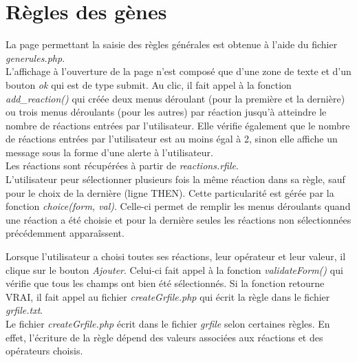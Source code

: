\section{Règles des gènes}
La page permettant la saisie des règles générales est obtenue à l'aide du fichier \emph{generules.php}.\\
L'affichage à l'ouverture de la page n'est composé que d'une zone de texte et d'un bouton \emph{ok} qui est de type submit. Au clic, il fait appel à la fonction \emph{add\_reaction()} qui créée deux menus déroulant (pour la première et la dernière) ou trois menus déroulants (pour les autres) par réaction jusqu'à atteindre le nombre de réactions entrées par l'utilisateur. Elle vérifie également que le nombre de réactions entrées par l'utilisateur est au moins égal à 2, sinon elle affiche un message sous la forme d'une alerte à l'utilisateur.\\
Les réactions sont récupérées à partir de \emph{reactions.rfile}.\\

L'utilisateur peur sélectionner plusieurs fois la m\^eme réaction dans sa règle, sauf pour le choix de la dernière (ligne THEN). Cette particularité est gérée par la fonction \emph{choice(form, val)}. Celle-ci permet de remplir les menus déroulants quand une réaction a été choisie et pour la dernière seules les réactions non sélectionnées précédemment appara\^issent.

Lorsque l'utilisateur a choisi toutes ses réactions, leur opérateur et leur valeur, il clique sur le bouton \emph{Ajouter}. Celui-ci fait appel à la fonction \emph{validateForm()} qui vérifie que tous les champs ont bien été sélectionnés. Si la fonction retourne VRAI, il fait appel au fichier \emph{createGrfile.php} qui écrit la règle dans le fichier \emph{grfile.txt}.\\
Le fichier \emph{createGrfile.php} écrit dans le fichier \emph{grfile} selon certaines règles. En effet, l'écriture de la règle dépend des valeurs associées aux réactions et des opérateurs choisis.\\

